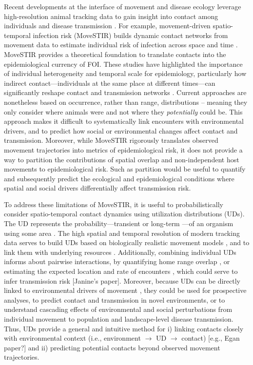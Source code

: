 ﻿\documentclass[11pt]{article}
\begin{document}
Recent developments at the interface of movement and disease ecology leverage high-resolution animal tracking data to gain insight into contact among individuals and disease transmission \citep{Richardson2015,Wilber2022,Yang2023}. For example, movement-driven spatio-temporal infection risk (MoveSTIR) builds dynamic contact networks from movement data to estimate individual risk of infection across space and time \citep{Wilber2022}. MoveSTIR provides a theoretical foundation to translate contacts into the epidemiological currency of FOI. These studies have highlighted the importance of individual heterogeneity and temporal scale for epidemiology, particularly how indirect contact---individuals at the same place at different times---can significantly reshape contact and transmission networks \citep{Richardson2015,Yang2023}. Current approaches are nonetheless based on occurrence, rather than range, distributions \citep[in the terminology of ][]{Alston2022} -- meaning they only consider where animals were and not where they \emph{potentially} could be. This approach makes it difficult to systematically link encounters with environmental drivers, and to predict how social or environmental changes affect contact and transmission.  Moreover, while MoveSTIR rigorously translates observed movement trajectories into metrics of epidemiological risk, it does not provide a way to partition the contributions of spatial overlap and non-independent host movements to epidemiological risk. Such as partition would be useful to quantify and subsequently predict the ecological and epidemiological conditions where spatial and social drivers differentially affect transmission risk.

To address these limitations of MoveSTIR, it is useful to probabilistically consider spatio-temporal contact dynamics using utilization distributions (UDs). The UD represents the probability---transient or long-term \citep{Tao2016}---of an organism using some area \citep{Worton1989}. The high spatial and temporal resolution of modern tracking data serves to build UDs based on biologically realistic movement models \citep{Kranstauber2012,Fleming2014}, and to link them with underlying resources \citep{Potts2023}.
Additionally, combining individual UDs informs about pairwise interactions, by quantifying home range overlap \citep{Winner2018}, or estimating the expected location and rate of encounters \citep{Noonan2021}, which could serve to infer transmission risk \citep{Godfrey2010,Godfrey2013,Noonan2021} [Janine's paper]. 
Moreover, because UDs can be directly linked to environmental drivers of movement \citep{Signer2017}, they could be used for prospective analyses, to predict contact and transmission in novel environments, or to understand cascading effects of environmental and social perturbations from individual movement to population and landscape-level disease transmission.  Thus, UDs provide a general and intuitive method for i) linking contacts closely with environmental context (i.e., environment $\rightarrow$ UD $\rightarrow$ contact) [e.g., Egan paper?] and ii) predicting potential contacts beyond observed movement trajectories.
\end{document}
